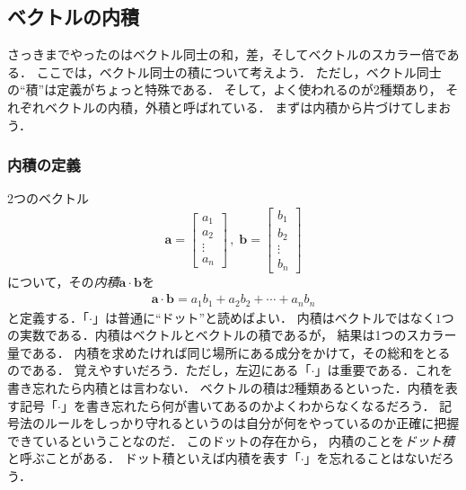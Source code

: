 \subsection{ベクトルの内積}
さっきまでやったのはベクトル同士の和，差，そしてベクトルのスカラー倍である．
ここでは，ベクトル同士の積について考えよう．
ただし，ベクトル同士の``積''は定義がちょっと特殊である．
そして，よく使われるのが2種類あり，
それぞれベクトルの内積，外積と呼ばれている．
まずは内積から片づけてしまおう．
\subsubsection{内積の定義}
2つのベクトル
$$
\bm{a} = \left[
 \begin{array}{c}
   a_1 \\
   a_2 \\
   \vdots \\
   a_n 
 \end{array}
            \right]
\,  ,  \;  
\bm{b} = \left[
 \begin{array}{c}
   b_1 \\
   b_2 \\
   \vdots \\
   b_n 
 \end{array}
            \right]
$$について，その\emph{内積}$\bm{a} \cdot \bm{b}$を
\begin{align}
\bm{a} \cdot \bm{b} = a_1 b_1 + a_2 b_2 + \cdots + a_n b_n
\label{eq:naiseki}
\end{align}
と定義する．「$\cdot$」は普通に``ドット''と読めばよい．
内積はベクトルではなく$1$つの実数である．内積はベクトルとベクトルの積であるが，
結果は1つのスカラー量である．
内積を求めたければ同じ場所にある成分をかけて，その総和をとるのである．
覚えやすいだろう．ただし，左辺にある「$\cdot$」は重要である．これを書き忘れたら内積とは言わない．
ベクトルの積は2種類あるといった．内積を表す記号「$\cdot$」を書き忘れたら何が書いてあるのかよくわからなくなるだろう．
記号法のルールをしっかり守れるというのは自分が何をやっているのか正確に把握できているということなのだ．
このドットの存在から，
内積のことを\emph{ドット積}
と呼ぶことがある．
ドット積といえば内積を表す「$\cdot$」を忘れることはないだろう．

